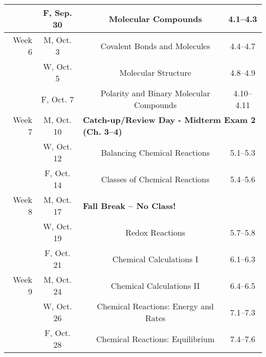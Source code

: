 \documentclass[12pt, letterpaper]{article}
\begin{document}
\begin{tabular}{rcccc}
	       & F, Sep. 30 &                                                                              & Molecular Compounds                                 & 4.1--4.3   \\
	\midrule
	Week 6 & M, Oct. 3  &                                                                              & Covalent Bonds and Molecules                        & 4.4--4.7   \\
	       & W, Oct. 5  &                                                                              & Molecular Structure                                 & 4.8--4.9   \\
	       & F, Oct. 7  &                                                                              & Polarity and Binary Molecular Compounds             & 4.10--4.11 \\
	\midrule
	Week 7 & M, Oct. 10 & \multicolumn{3}{l}{\textbf{Catch-up/Review Day - Midterm Exam 2 (Ch. 3--4)}}                                                                    \\
	       & W, Oct. 12 &                                                                              & Balancing Chemical Reactions                        & 5.1--5.3   \\
	       & F, Oct. 14 &                                                                              & Classes of Chemical Reactions                       & 5.4--5.6   \\
	\midrule
	Week 8 & M, Oct. 17 & \multicolumn{3}{l}{\textbf{Fall Break -- No Class!}}                                                                                            \\
	       & W, Oct. 19 &                                                                              & Redox Reactions                                     & 5.7--5.8   \\
	       & F, Oct. 21 &                                                                              & Chemical Calculations I                             & 6.1--6.3   \\
	\midrule
	Week 9 & M, Oct. 24 &                                                                              & Chemical Calculations II                            & 6.4--6.5   \\
	       & W, Oct. 26 &                                                                              & Chemical Reactions: Energy and Rates                & 7.1--7.3   \\
	       & F, Oct. 28 &                                                                              & Chemical Reactions: Equilibrium                     & 7.4--7.6   \\
\end{tabular}
\end{document}
